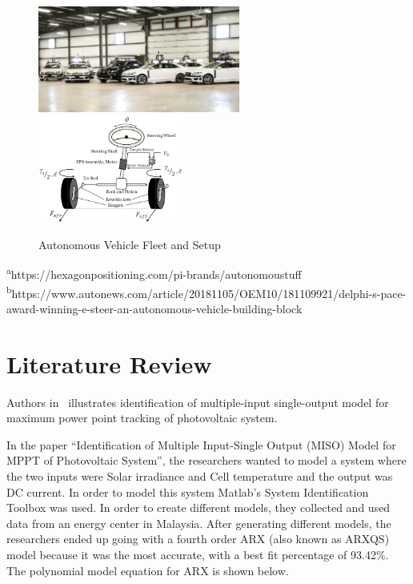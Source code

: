 \documentclass[letterpaper,12pt]{article}   %
\begin{document}
\vspace*{12pt}

\begin{figure}[h]
	\centering
		{\includegraphics[height=3.5cm, width=0.4\linewidth]{figs/img/autonomousVehiclesAStuff}}
		{\includegraphics[height=3.5cm, width=0.4\linewidth]{figs/img/autonomousVehiclesSteering}}
	\caption{Autonomous Vehicle Fleet and Setup}
\end{figure}

\noindent \begin{tiny}
	\textsuperscript{a}https://hexagonpositioning.com/pi-brands/autonomoustuff\\\textsuperscript{b}https://www.autonews.com/article/20181105/OEM10/181109921/delphi-s-pace-award-winning-e-steer-an-autonomous-vehicle-building-block
\end{tiny}

 \section{Literature Review}

Authors in~\cite{Hussain2011} illustrates identification of multiple-input single-output model for maximum power point tracking of photovoltaic system.  
 
In the paper “Identification of Multiple Input-Single Output (MISO) Model for MPPT of Photovoltaic System”, the researchers wanted to model a system where the two inputs were Solar irradiance and Cell temperature and the output was DC current. In order to model this system Matlab’s System Identification Toolbox was used. In order to create different models, they collected and used data from an energy center in Malaysia. After generating different models, the researchers ended up going with a fourth order ARX (also known as ARXQS) model because it was the most accurate, with a best fit percentage of 93.42\%. The polynomial model equation for ARX is shown below. 
\end{document}
